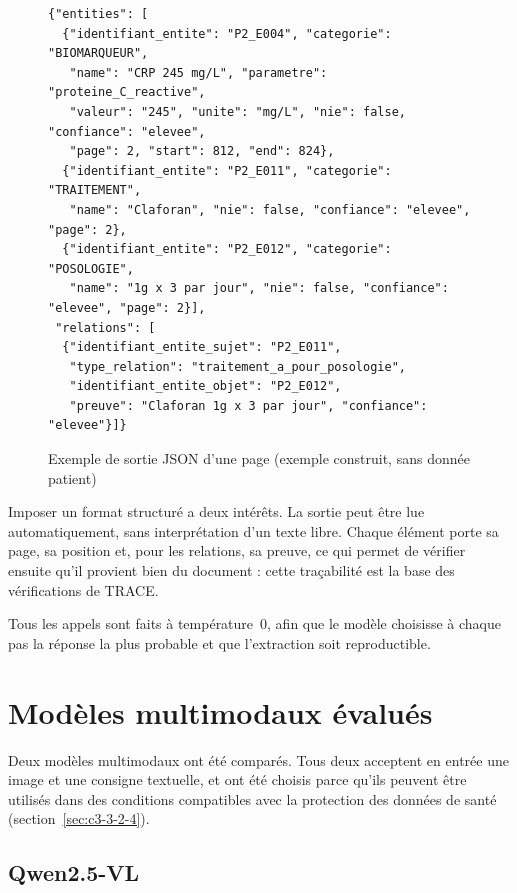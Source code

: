 \begin{figure}[H]
\centering
\begin{minipage}{0.92\linewidth}
\footnotesize
\begin{verbatim}
{"entities": [
  {"identifiant_entite": "P2_E004", "categorie": "BIOMARQUEUR",
   "name": "CRP 245 mg/L", "parametre": "proteine_C_reactive",
   "valeur": "245", "unite": "mg/L", "nie": false, "confiance": "elevee",
   "page": 2, "start": 812, "end": 824},
  {"identifiant_entite": "P2_E011", "categorie": "TRAITEMENT",
   "name": "Claforan", "nie": false, "confiance": "elevee", "page": 2},
  {"identifiant_entite": "P2_E012", "categorie": "POSOLOGIE",
   "name": "1g x 3 par jour", "nie": false, "confiance": "elevee", "page": 2}],
 "relations": [
  {"identifiant_entite_sujet": "P2_E011",
   "type_relation": "traitement_a_pour_posologie",
   "identifiant_entite_objet": "P2_E012",
   "preuve": "Claforan 1g x 3 par jour", "confiance": "elevee"}]}
\end{verbatim}
\end{minipage}
\caption{Exemple de sortie JSON d'une page (exemple construit, sans donnée patient)}\label{fig:c4-json}
\end{figure}

Imposer un format structuré a deux intérêts. La sortie peut être lue automatiquement, sans interprétation d'un texte libre. Chaque élément porte sa page, sa position et, pour les relations, sa preuve, ce qui permet de vérifier ensuite qu'il provient bien du document : cette traçabilité est la base des vérifications de TRACE.

Tous les appels sont faits à température~0, afin que le modèle choisisse à chaque pas la réponse la plus probable et que l'extraction soit reproductible.

\section{Modèles multimodaux évalués}\label{sec:c4-modeles}

Deux modèles multimodaux ont été comparés. Tous deux acceptent en entrée une image et une consigne textuelle, et ont été choisis parce qu'ils peuvent être utilisés dans des conditions compatibles avec la protection des données de santé (section~\ref{sec:c3-3-2-4}).

\subsection{Qwen2.5-VL}\label{sec:c4-qwen}

